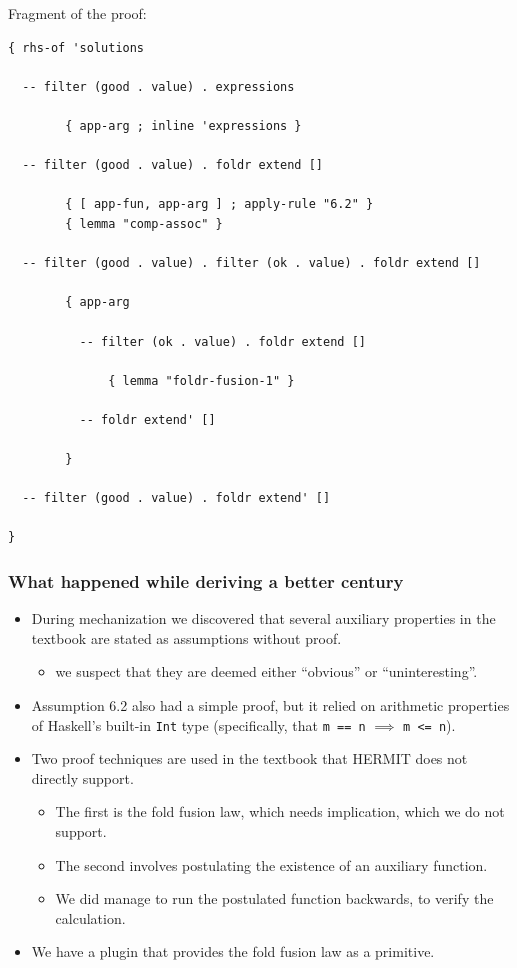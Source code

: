 \begin{frame}[verbatim]

Fragment of the proof:

\tiny
\begin{verbatim}
{ rhs-of 'solutions

  -- filter (good . value) . expressions

        { app-arg ; inline 'expressions }

  -- filter (good . value) . foldr extend []

        { [ app-fun, app-arg ] ; apply-rule "6.2" }
        { lemma "comp-assoc" }

  -- filter (good . value) . filter (ok . value) . foldr extend []

        { app-arg

          -- filter (ok . value) . foldr extend []

              { lemma "foldr-fusion-1" }

          -- foldr extend' []

        }

  -- filter (good . value) . foldr extend' []

}
\end{verbatim}


\end{frame}



\begin{frame}[verbatim]
\frametitle{What happened while deriving a better century}

\begin{itemize}
\item  During mechanization we discovered that several auxiliary properties in the textbook
  are stated as assumptions without proof.
\begin{itemize}
\item we suspect that they are deemed either ``obvious'' or ``uninteresting''.
\end{itemize}
\item Assumption 6.2 also had a simple proof, but it relied on arithmetic properties of Haskell's built-in \verb|Int| type
(specifically, that \verb|m == n| $\implies$ \verb|m <= n|).
\item Two proof techniques are used in the textbook that HERMIT does not directly support.
\begin{itemize}
\item The first is the fold fusion law, which needs implication, which we do not support.
\item The second involves postulating the existence of an auxiliary function.
\item We did manage to run the postulated function backwards, to verify the calculation.
\end{itemize}
\item We have a plugin that provides the fold fusion law as a primitive.
\end{itemize}
\end{frame}



